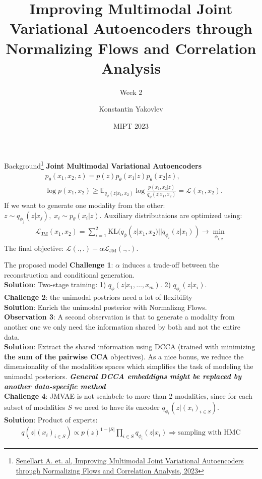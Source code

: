 \documentclass[aspectratio=169]{beamer}
\title[Week 2]
{Improving Multimodal Joint Variational Autoencoders through Normalizing Flows and Correlation Analysis}
\subtitle{Week 2}
\author[] %
{
Konstantin Yakovlev \inst{1} \and
}
\institute[] %
{
  \inst{1}%
  MIPT \\
  Moscow, Russia
}
\date[MIPT 2023] %
{MIPT 2023}
\begin{document}
\frame{\titlepage}

\begin{frame}{Background\footnote{\href{https://arxiv.org/pdf/2305.11832.pdf}{Senellart A. et. al, Improving Multimodal Joint Variational Autoencoders through Normalizing Flows and Correlation Analysis, 2023}}}
    \textbf{Joint Multimodal Variational Autoencoders}
    \begin{align*}
        &p_\theta(x_1, x_2, z) = p(z)p_\theta(x_1|z)p_\theta(x_2|z), \\
        &\log p(x_1, x_2) \geq \mathbb{E}_{q_\phi(z|x_1, x_2)}\log\frac{p(x_1, x_2|z)}{q_\phi(z|x_1, x_2)} = \mathcal{L}(x_1, x_2).
    \end{align*}
    If we want to generate one modality from the other: $z\sim q_{\phi_j}(z|x_j), \; x_i\sim p_\theta(x_i|z)$.
    Auxiliary distributaions are optimized using:
    \begin{align*}
        \mathcal{L}_\text{JM}(x_1, x_2) = \sum_{i=1}^2\mathrm{KL}(q_\phi(z|x_1, x_2)||q_{\phi_i}(z|x_i)) \to \min_{\phi_{1,2}}
    \end{align*}
    The final objective: $\mathcal{L}(., .) - \alpha\mathcal{L}_\text{JM}(., .)$.
\end{frame}

\begin{frame}{The proposed model}
    \textbf{Challenge 1}: $\alpha$ induces a trade-off between the reconstruction and conditional generation.\\
    \textbf{Solution}: Two-stage training: 1) $q_\phi(z|x_1, \ldots, x_m)$. 2) $q_{\phi_i}(z|x_i)$. \\
    \textbf{Challenge 2}: the unimodal postriors need a lot of flexibility \\
    \textbf{Solution}: Enrich the unimodal posterior with Normalizng Flows. \\
    \textbf{Observation 3}: A second observation is that to generate a modality from another one we only need
    the information shared by both and not the entire data. \\
    \textbf{Solution}: Extract the shared information using DCCA (trained with minimizing \textbf{the sum of the pairwise CCA} objectives).
    As a nice bonus, we reduce the dimensionality of the modalities spaces which simplifies the task of modeling the unimodal posteriors.
    \textbf{\textit{General DCCA embeddigns might be replaced by another data-specific method}}\\
    \textbf{Challenge 4}: JMVAE is not scalabele to more than 2 modalities, since for each subset of modalities $S$ we need to
    have its encoder $q_{\phi_i}(z|(x_i)_{i\in S})$.  \\
    \textbf{Solution}: Product of experts:
    \begin{align*}
        q(z|(x_i)_{i\in S}) \propto p(z)^{1 - |S|}\prod_{i\in S}q_{\phi_i}(z|x_i) \Rightarrow \text{sampling with HMC}
    \end{align*}

    
\end{frame}
\end{document}
